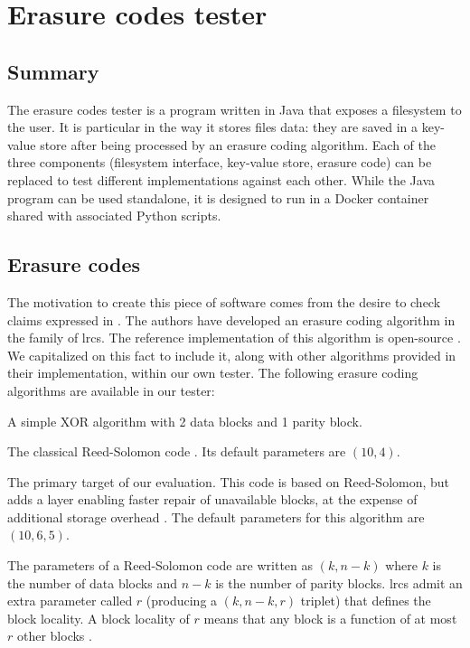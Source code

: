 \section{Erasure codes tester}

\subsection{Summary}

The erasure codes tester is a program written in Java that exposes a filesystem to the user.
It is particular in the way it stores files data: they are saved in a key-value store after being processed by an erasure coding algorithm.
Each of the three components (filesystem interface, key-value store, erasure code) can be replaced to test different implementations against each other.
While the Java program can be used standalone, it is designed to run in a Docker container shared with associated Python scripts.

\subsection{Erasure codes}

The motivation to create this piece of software comes from the desire to check claims expressed in  \autocite{XorbasVLDB}.
The authors have developed an erasure coding algorithm in the family of \acfp{lrc}.
The reference implementation of this algorithm is open-source \autocite{xorbas-github}.
We capitalized on this fact to include it, along with other algorithms provided in their implementation, within our own tester.
The following erasure coding algorithms are available in our tester:
\begin{description}
\item[XOR] A simple XOR algorithm with 2 data blocks and 1 parity block.
\item[Reed-Solomon] The classical Reed-Solomon code \autocite{reed-solomon}. Its default parameters are $(10,4)$.
\item[\ac{lrc}] The primary target of our evaluation. This code is based on Reed-Solomon, but adds a layer enabling faster repair of unavailable blocks, at the expense of additional storage overhead \autocite{XorbasVLDB}. The default parameters for this algorithm are $(10,6,5)$.
\end{description}
The parameters of a Reed-Solomon code are written as $(k,n-k)$ where $k$ is the number of data blocks and $n-k$ is the number of parity blocks.
\acp{lrc} admit an extra parameter called $r$ (producing a $(k,n-k,r)$ triplet) that defines the block locality.
A block locality of $r$ means that any block is a function of at most $r$ other blocks \autocite{XorbasVLDB}.

